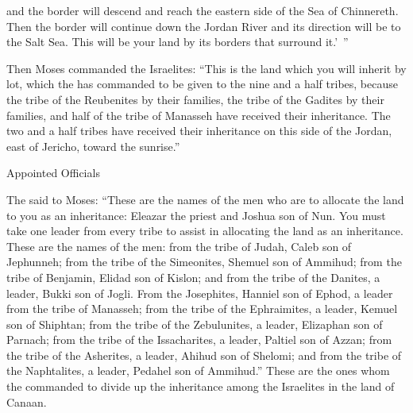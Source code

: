 {and the border
will descend
and reach
the eastern
side
of the Sea
of Chinnereth.
Then the border
will continue down
the Jordan River
and its direction
will be
to the Salt
Sea.
This
will be
your land
by its borders
that surround it.’ ”
\par }{\PP {}Then Moses
commanded
the
Israelites: “This
is the land
which
you will inherit
by lot,
which
the {}
has commanded
to be given
to the nine
and a half
tribes,
because
the tribe
of the Reubenites
by their families,
the tribe
of the Gadites
by their families,
and half
of the tribe
of Manasseh
have received
their inheritance.
The two
and a half
tribes
have received
their inheritance
on this side
of the Jordan,
east
of Jericho,
toward the sunrise.”
\par }{\SH Appointed Officials
\par }{\PP {}The
{}
said
to
Moses:
“These
are the names
of the men
who
are to allocate
the land
to you as an inheritance: Eleazar
the priest
and Joshua
son
of Nun.
You must take
one
leader
from every tribe
to assist in allocating
the land as an inheritance.
These
are the names
of the men: from the tribe
of Judah,
Caleb
son
of Jephunneh;
from the tribe
of the Simeonites,
Shemuel
son
of Ammihud;
from the tribe
of Benjamin,
Elidad
son
of Kislon;
and from the tribe
of the Danites,
a leader,
Bukki
son
of Jogli.
From the Josephites,
Hanniel
son
of Ephod,
a leader
from the tribe
of Manasseh;
from the tribe
of the Ephraimites,
a leader,
Kemuel
son
of Shiphtan;
from the tribe
of the Zebulunites,
a leader,
Elizaphan
son
of Parnach;
from the tribe of the Issacharites,
a leader,
Paltiel
son
of Azzan;
from the tribe
of the Asherites,
a leader,
Ahihud
son
of Shelomi;
and from the tribe
of the Naphtalites,
a leader,
Pedahel
son
of Ammihud.”
These
are the ones whom
the {}
commanded
to divide up the inheritance
among the Israelites
in the land
of Canaan.


}

